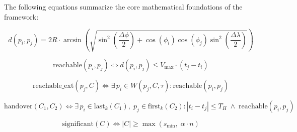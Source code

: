 The following equations summarize the core mathematical foundations of the framework:

\begin{equation}
\label{eq:haversine}
d(p_i, p_j) = 2R \cdot \arcsin\!\left(\sqrt{\sin^2\!\left(\frac{\Delta\phi}{2}\right) + \cos(\phi_i)\cos(\phi_j)\sin^2\!\left(\frac{\Delta\lambda}{2}\right)}\right)
\end{equation}

\begin{equation}
\label{eq:reachability}
\mathrm{reachable}(p_i, p_j) \iff d(p_i,p_j) \leq V_{\max} \cdot (t_j - t_i)
\end{equation}

\begin{equation}
\label{eq:jitter}
\mathrm{reachable\_ext}(p_j, C) \iff \exists\, p_i \in W(p_j, C, \tau) : \mathrm{reachable}(p_i, p_j)
\end{equation}

\begin{equation}
\label{eq:handover}
\mathrm{handover}(C_1, C_2) \iff \exists\, p_i \in \mathrm{last}_k(C_1),\; p_j \in \mathrm{first}_k(C_2) : |t_i - t_j| \leq T_H \;\wedge\; \mathrm{reachable}(p_i, p_j)
\end{equation}

\begin{equation}
\label{eq:significant}
\mathrm{significant}(C) \iff |C| \geq \max\!\left(s_{\min},\; \alpha \cdot n\right)
\end{equation}

